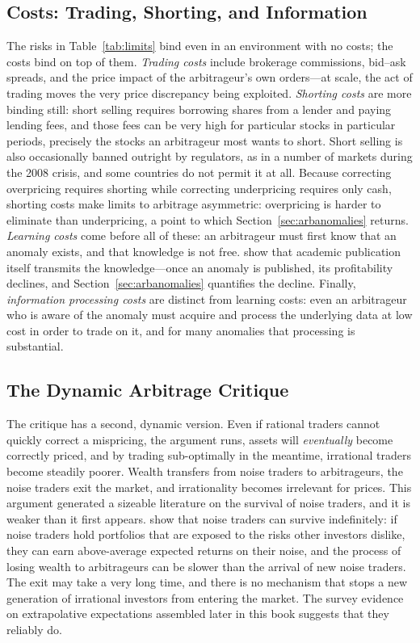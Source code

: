\subsection{Costs: Trading, Shorting, and Information}

The risks in Table~\ref{tab:limits} bind even in an environment with no costs; the costs bind on top of them. \emph{Trading costs} include brokerage commissions, bid--ask spreads, and the price impact of the arbitrageur's own orders---at scale, the act of trading moves the very price discrepancy being exploited. \emph{Shorting costs} are more binding still: short selling requires borrowing shares from a lender and paying lending fees, and those fees can be very high for particular stocks in particular periods, precisely the stocks an arbitrageur most wants to short. Short selling is also occasionally banned outright by regulators, as in a number of markets during the 2008 crisis, and some countries do not permit it at all. Because correcting overpricing requires shorting while correcting underpricing requires only cash, shorting costs make limits to arbitrage asymmetric: overpricing is harder to eliminate than underpricing, a point to which Section~\ref{sec:arbanomalies} returns. \emph{Learning costs} come before all of these: an arbitrageur must first know that an anomaly exists, and that knowledge is not free. \citet{mclean2016} show that academic publication itself transmits the knowledge---once an anomaly is published, its profitability declines, and Section~\ref{sec:arbanomalies} quantifies the decline. Finally, \emph{information processing costs} are distinct from learning costs: even an arbitrageur who is aware of the anomaly must acquire and process the underlying data at low cost in order to trade on it, and for many anomalies that processing is substantial.

\subsection{The Dynamic Arbitrage Critique}
\label{sec:dynamic}

The critique has a second, dynamic version. Even if rational traders cannot quickly correct a mispricing, the argument runs, assets will \emph{eventually} become correctly priced, and by trading sub-optimally in the meantime, irrational traders become steadily poorer. Wealth transfers from noise traders to arbitrageurs, the noise traders exit the market, and irrationality becomes irrelevant for prices. This argument generated a sizeable literature on the survival of noise traders, and it is weaker than it first appears. \citet{delong1991} show that noise traders can survive indefinitely: if noise traders hold portfolios that are exposed to the risks other investors dislike, they can earn above-average expected returns on their noise, and the process of losing wealth to arbitrageurs can be slower than the arrival of new noise traders. The exit may take a very long time, and there is no mechanism that stops a new generation of irrational investors from entering the market. The survey evidence on extrapolative expectations assembled later in this book suggests that they reliably do.

